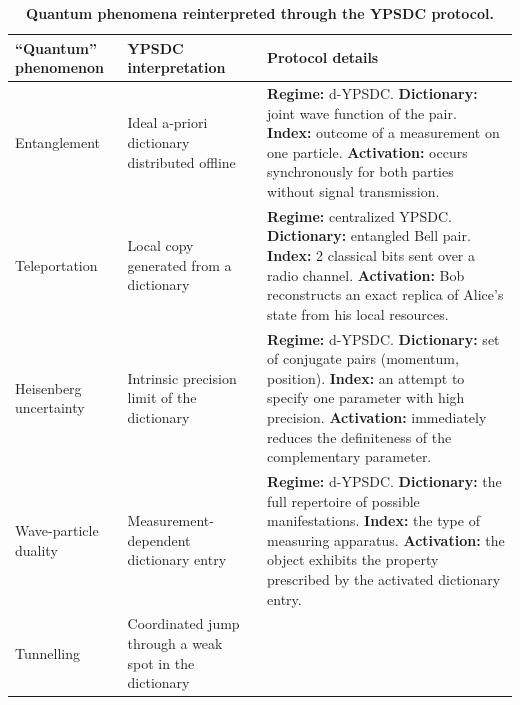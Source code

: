 \documentclass[12pt,a4paper]{article}
\theoremstyle{remark}
\begin{document}
	\begin{table}[htbp]
		\centering
		\caption{\normalsize\textbf{Quantum phenomena reinterpreted through the YPSDC protocol.}}
		\label{tab:quantum-ypsdc}
		\small
		\begin{tabular}{p{2.5cm} p{4.8cm} p{7.8cm}}
			\toprule
			\textbf{``Quantum'' phenomenon} &
			\textbf{YPSDC interpretation} &
			\textbf{Protocol details} \\
			\midrule
			Entanglement &
			Ideal a-priori dictionary distributed offline &
			\textbf{Regime:} d-YPSDC. \newline
			\textbf{Dictionary:} joint wave function of the pair. \newline
			\textbf{Index:} outcome of a measurement on one particle. \newline
			\textbf{Activation:} occurs synchronously for both parties without signal transmission. \\
			\midrule
			Teleportation &
			Local copy generated from a dictionary &
			\textbf{Regime:} centralized YPSDC. \newline
			\textbf{Dictionary:} entangled Bell pair. \newline
			\textbf{Index:} 2 classical bits sent over a radio channel. \newline
			\textbf{Activation:} Bob reconstructs an exact replica of Alice's state from his local resources. \\
			\midrule
			Heisenberg uncertainty &
			Intrinsic precision limit of the dictionary &
			\textbf{Regime:} d-YPSDC. \newline
			\textbf{Dictionary:} set of conjugate pairs (momentum, position). \newline
			\textbf{Index:} an attempt to specify one parameter with high precision. \newline
			\textbf{Activation:} immediately reduces the definiteness of the complementary parameter. \\
			\midrule
			Wave-particle duality &
			Measurement-dependent dictionary entry &
			\textbf{Regime:} d-YPSDC. \newline
			\textbf{Dictionary:} the full repertoire of possible manifestations. \newline
			\textbf{Index:} the type of measuring apparatus. \newline
			\textbf{Activation:} the object exhibits the property prescribed by the activated dictionary entry. \\
			\midrule
			Tunnelling &
			Coordinated jump through a weak spot in the dictionary &

\end{tabular}
\end{table}
\end{document}
